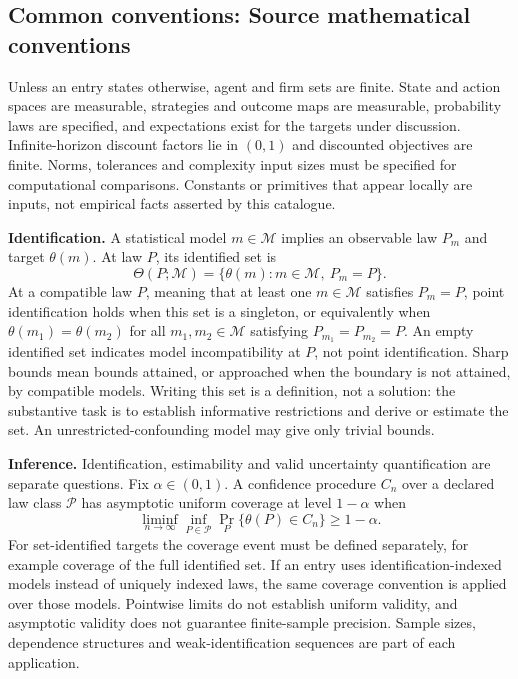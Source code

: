 \documentclass[11pt,a4paper]{article}
\begin{document}
\subsection*{Common conventions: Source mathematical conventions}

Unless an entry states otherwise, agent and firm sets are finite. State and action spaces are measurable, strategies and outcome maps are measurable, probability laws are specified, and expectations exist for the targets under discussion. Infinite-horizon discount factors lie in $(0,1)$ and discounted objectives are finite. Norms, tolerances and complexity input sizes must be specified for computational comparisons. Constants or primitives that appear locally are inputs, not empirical facts asserted by this catalogue.

\textbf{Identification.} A statistical model $m\in\mathcal M$ implies an observable law $P_m$ and target $\theta(m)$. At law $P$, its identified set is
\[
\Theta(P;\mathcal M)=\{\theta(m):m\in\mathcal M,\ P_m=P\}.
\]
At a compatible law $P$, meaning that at least one $m\in\mathcal M$ satisfies $P_m=P$, point identification holds when this set is a singleton, or equivalently when $\theta(m_1)=\theta(m_2)$ for all $m_1,m_2\in\mathcal M$ satisfying $P_{m_1}=P_{m_2}=P$. An empty identified set indicates model incompatibility at $P$, not point identification. Sharp bounds mean bounds attained, or approached when the boundary is not attained, by compatible models. Writing this set is a definition, not a solution: the substantive task is to establish informative restrictions and derive or estimate the set. An unrestricted-confounding model may give only trivial bounds.

\textbf{Inference.} Identification, estimability and valid uncertainty quantification are separate questions. Fix $\alpha\in(0,1)$. A confidence procedure $C_n$ over a declared law class $\mathcal P$ has asymptotic uniform coverage at level $1-\alpha$ when
\[
\liminf_{n\to\infty}\inf_{P\in\mathcal P}\Pr_P\{\theta(P)\in C_n\}\geq1-\alpha.
\]
For set-identified targets the coverage event must be defined separately, for example coverage of the full identified set. If an entry uses identification-indexed models instead of uniquely indexed laws, the same coverage convention is applied over those models. Pointwise limits do not establish uniform validity, and asymptotic validity does not guarantee finite-sample precision. Sample sizes, dependence structures and weak-identification sequences are part of each application.
\end{document}
